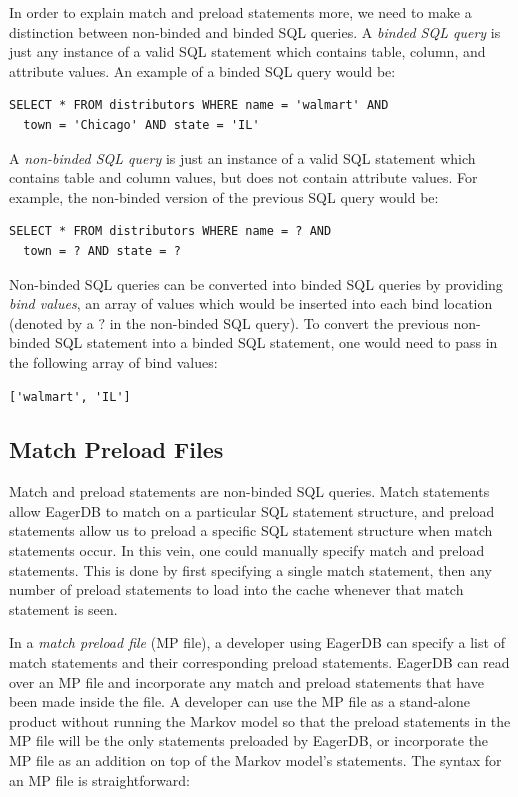 \documentclass[12pt]{article}
\begin{document}
In order to explain match and preload statements more, we need to make a distinction between non-binded and binded SQL queries. A \emph{binded SQL query} is just any instance of a valid SQL statement which contains table, column, and attribute values. An example of a binded SQL query would be:

\begin{lstlisting}
SELECT * FROM distributors WHERE name = 'walmart' AND
  town = 'Chicago' AND state = 'IL'
\end{lstlisting}

A \emph{non-binded SQL query} is just an instance of a valid SQL statement which contains table and column values, but does not contain attribute values. For example, the non-binded version of the previous SQL query would be:

\begin{lstlisting}
SELECT * FROM distributors WHERE name = ? AND
  town = ? AND state = ?
\end{lstlisting}

Non-binded SQL queries can be converted into binded SQL queries by providing \emph{bind values}, an array of values which would be inserted into each bind location (denoted by a $?$ in the non-binded SQL query). To convert the previous non-binded SQL statement into a binded SQL statement, one would need to pass in the following array of bind values:

\begin{lstlisting}
['walmart', 'IL']
\end{lstlisting}

\subsection{Match Preload Files}

Match and preload statements are non-binded SQL queries. Match statements allow EagerDB to match on a particular SQL statement structure, and preload statements allow us to preload a specific SQL statement structure when match statements occur. In this vein, one could manually specify match and preload statements. This is done by first specifying a single match statement, then any number of preload statements to load into the cache whenever that match statement is seen.

In a \emph{match preload file} (MP file), a developer using EagerDB can specify a list of match statements and their corresponding preload statements. EagerDB can read over an MP file and incorporate any match and preload statements that have been made inside the file. A developer can use the MP file as a stand-alone product without running the Markov model so that the preload statements in the MP file will be the only statements preloaded by EagerDB, or incorporate the MP file as an addition on top of the Markov model's statements. The syntax for an MP file is straightforward:
\end{document}
